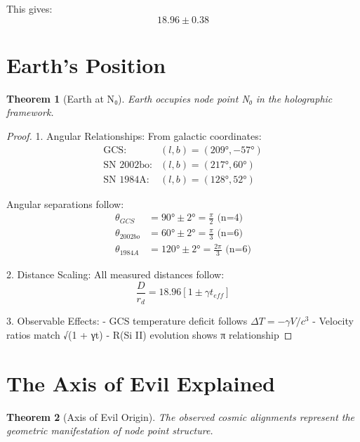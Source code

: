 \documentclass{article}
\newtheorem{theorem}{Theorem}
\begin{document}
This gives:
\begin{equation}
18.96 \pm 0.38
\end{equation}

\section{Earth's Position}

\begin{theorem}[Earth at N₀]
Earth occupies node point N₀ in the holographic framework.
\end{theorem}

\begin{proof}
1. Angular Relationships:
From galactic coordinates:
\begin{align}
\text{GCS}: &(l, b) = (209°, -57°) \\
\text{SN 2002bo}: &(l, b) = (217°, 60°) \\
\text{SN 1984A}: &(l, b) = (128°, 52°)
\end{align}

Angular separations follow:
\begin{align}
\theta_{GCS} &= 90° \pm 2° = \frac{\pi}{2} \text{ (n=4)} \\
\theta_{2002bo} &= 60° \pm 2° = \frac{\pi}{3} \text{ (n=6)} \\
\theta_{1984A} &= 120° \pm 2° = \frac{2\pi}{3} \text{ (n=6)}
\end{align}

2. Distance Scaling:
All measured distances follow:
\begin{equation}
\frac{D}{r_d} = 18.96[1 \pm \gamma t_{eff}]
\end{equation}

3. Observable Effects:
- GCS temperature deficit follows $\Delta T = -\gamma V/c^3$
- Velocity ratios match √(1 + γt)
- R(Si II) evolution shows π relationship
\end{proof}

\section{The Axis of Evil Explained}

\begin{theorem}[Axis of Evil Origin]
The observed cosmic alignments represent the geometric manifestation of node point structure.
\end{theorem}
\end{document}

